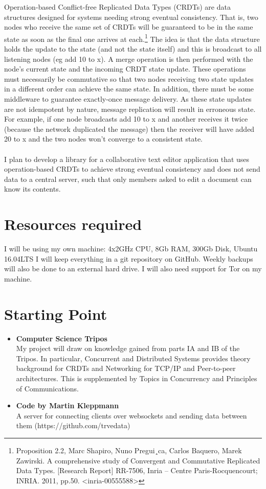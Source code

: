 \documentclass[12pt,a4paper]{article}
\begin{document}
Operation-based Conflict-free Replicated Data Types (CRDTs) are data structures designed for systems needing strong eventual consistency. That is, two nodes who receive the same set of CRDTs will be guaranteed to be in the same state as soon as the final one arrives at each.\footnote{Proposition 2.2, Marc Shapiro, Nuno Pregui¸ca, Carlos Baquero, Marek Zawirski. A comprehensive study of
Convergent and Commutative Replicated Data Types. [Research Report] RR-7506, Inria –
Centre Paris-Rocquencourt; INRIA. 2011, pp.50. \textless inria-00555588\textgreater} The idea is that the data structure holds the update to the state (and not the state itself) and this is broadcast to all listening nodes (eg add 10 to x). A merge operation is then performed with the node's current state and the incoming CRDT state update. These operations must necessarily be commutative so that two nodes receiving two state updates in a different order can achieve the same state. In addition, there must be some middleware to guarantee exactly-once message delivery. As these state updates are not idempotent by nature, message replication will result in erroneous state. For example, if one node broadcasts add 10 to x and another receives it twice (because the network duplicated the message) then the receiver will have added 20 to x and the two nodes won't converge to a consistent state.\\\\
I plan to develop a library for a collaborative text editor application that uses operation-based CRDTs to achieve strong eventual consistency and does not send data to a central server, such that only members asked to edit a document can know its contents.


\section*{Resources required}
I will be using my own machine: 4x2GHz CPU, 8Gb RAM, 300Gb Disk, Ubuntu 16.04LTS
I will keep everything in a git repository on GitHub.
Weekly backups will also be done to an external hard drive.
I will also need support for Tor on my machine.
\section*{Starting Point}
\begin{itemize}
	\item \textbf{Computer Science Tripos} \\ My project will draw on knowledge gained from parts IA and IB of the Tripos. In particular, Concurrent and Distributed Systems provides theory background for CRDTs and Networking for TCP/IP and Peer-to-peer architectures. This is supplemented by Topics in Concurrency and Principles of Communications.
	\item \textbf{Code by Martin Kleppmann} \\ A server for connecting clients over websockets and sending data between them (https://github.com/trvedata)\\
\end{itemize}
\end{document}
